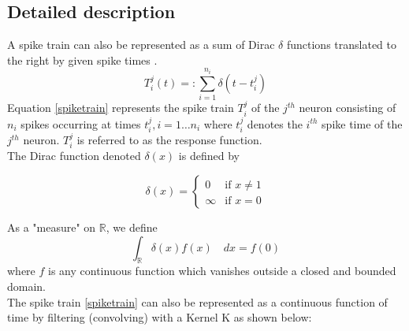 
\subsection{Detailed description}
A spike train can also be represented as a sum of Dirac $\delta$ functions translated
to the right by given spike times \cite{Dayan2001}.
\begin{equation}\label{spiketrain}
 T_{i}^{j}(t) =: \sum_{i=1}^{n_{i}} \delta(t-t_{i}^{j})  
\end{equation}
Equation \eqref{spiketrain} represents the spike train $T_{i}^{j}$ of the $j^{th}$ neuron consisting of $n_{i}$ spikes occurring at times $t_{i}^{j}, i = 1 \ldots n_{i}$ where $t_{i}^{j}$ denotes the $i^{th}$ spike time of the $j^{th}$ neuron.  $T_{i}^{j}$ is referred to as the response function.\\

The Dirac  function denoted $\delta(x)$ is defined by
\begin{Def}
\[
  \delta(x) =
  \begin{cases}
                                   0 & \text{if $x \neq 1$} \\
                                   \infty & \text{if $x=0$} 
  \end{cases}
\]
\end{Def}
As a "measure" on $\mathbb{R}$, we define
\begin{equation} \label{DiracDelta}
\displaystyle \int_{\mathbb{R}}  \delta(x)f(x) \quad dx = f(0) 
\end{equation}
where $f$ is any continuous function which vanishes outside a closed 
and bounded domain.\\






The  spike train \eqref{spiketrain} can also be represented as a continuous function of time by filtering (convolving) with a Kernel K as shown below:

